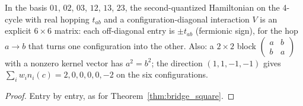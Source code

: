 \begin{lemma}
  \label{lem:H0Fw_square}
  \leanok
  In the basis $01$, $02$, $03$, $12$, $13$, $23$, the second-quantized Hamiltonian on the 4-cycle with real hopping
  $t_{ab}$ and a
  configuration-diagonal interaction $V$ is an explicit $6\times6$ matrix: each off-diagonal entry is $\pm t_{ab}$
  (fermionic sign), for the hop $a\to b$ that turns one configuration into the other. Also: a $2\times2$ block
  $\begin{pmatrix}a&b\\b&a\end{pmatrix}$ with a nonzero kernel vector has $a^2=b^2$; the direction $(1,1,-1,-1)$
  gives $\sum_iw_in_i(c)=2,0,0,0,0,-2$ on the six configurations.
\end{lemma}
\begin{proof}
  \leanok
  Entry by entry, as for Theorem~\ref{thm:bridge_square}.
\end{proof}

